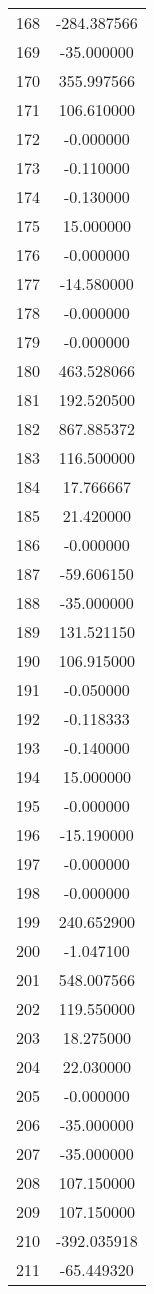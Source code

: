 \documentclass[12pt]{article}
\begin{document}
\begin{longtable}{@{}cc@{}}
168 & -284.387566 \\
169 & -35.000000 \\
170 & 355.997566 \\
171 & 106.610000 \\
172 & -0.000000 \\
173 & -0.110000 \\
174 & -0.130000 \\
175 & 15.000000 \\
176 & -0.000000 \\
177 & -14.580000 \\
178 & -0.000000 \\
179 & -0.000000 \\
180 & 463.528066 \\
181 & 192.520500 \\
182 & 867.885372 \\
183 & 116.500000 \\
184 & 17.766667 \\
185 & 21.420000 \\
186 & -0.000000 \\
187 & -59.606150 \\
188 & -35.000000 \\
189 & 131.521150 \\
190 & 106.915000 \\
191 & -0.050000 \\
192 & -0.118333 \\
193 & -0.140000 \\
194 & 15.000000 \\
195 & -0.000000 \\
196 & -15.190000 \\
197 & -0.000000 \\
198 & -0.000000 \\
199 & 240.652900 \\
200 & -1.047100 \\
201 & 548.007566 \\
202 & 119.550000 \\
203 & 18.275000 \\
204 & 22.030000 \\
205 & -0.000000 \\
206 & -35.000000 \\
207 & -35.000000 \\
208 & 107.150000 \\
209 & 107.150000 \\
210 & -392.035918 \\
211 & -65.449320 \\

\end{longtable}
\end{document}
